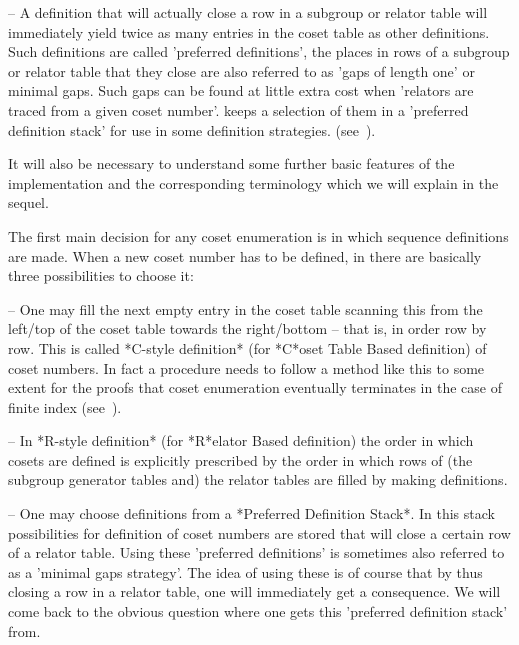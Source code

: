 \item{--} A definition that will actually close a row in a subgroup or
relator  table will  immediately yield  twice as  many entries  in the
coset  table  as  other  definitions.   Such  definitions  are  called
'preferred definitions', the  places in rows of a  subgroup or relator
table that they close are also  referred to as 'gaps of length one' or
minimal  gaps.  Such  gaps  can be  found  at little  extra cost  when
'relators  are traced  from a  given  coset number'.   {\ACE} keeps  a
selection of  them in a 'preferred  definition stack' for  use in some
definition strategies. (see~\cite{Hav91}).

\endlist

It will also be necessary to understand some further basic features of
the  implementation and  the corresponding  terminology which  we will
explain in the sequel.


The first main decision for any coset enumeration is in which sequence
definitions are  made. When a new  coset number has to  be defined, in
{\ACE} there are basically three possibilities to choose it:

\beginlist

\item{--}  One  may fill  the  next empty  entry  in  the coset  table
scanning  this  from the  left/top  of  the  coset table  towards  the
right/bottom -- that is, in order  row by row. This is called *C-style
definition* (for *C*oset Table Based definition) of coset numbers.  In
fact a procedure needs to follow a method like this to some extent for
the proofs that coset enumeration eventually terminates in the case of
finite index (see~\cite{Neu82}).

\item{--} In *R-style definition* (for *R*elator Based definition) the
order  in which  cosets are  defined is  explicitly prescribed  by the
order in which rows of (the subgroup generator tables and) the relator
tables are filled by making definitions.

\item{--}  One may  choose  definitions from  a *Preferred  Definition
Stack*.  In  this stack possibilities for definition  of coset numbers
are stored  that will close a  certain row of a  relator table.  Using
these  'preferred definitions'  is  sometimes also  referred  to as  a
'minimal gaps strategy'.  The idea of using these is of course that by
thus closing  a row  in a  relator table, one  will immediately  get a
consequence. We will come back  to the obvious question where one gets
this 'preferred definition stack' from.

